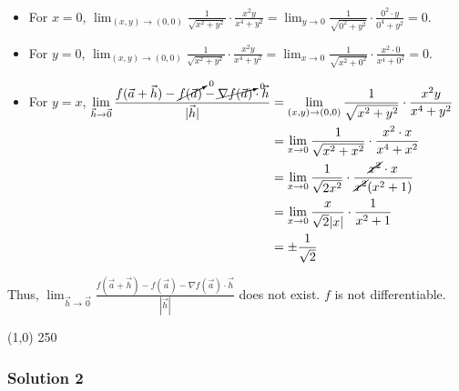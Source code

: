 \begin{itemize}
    \item For $x = 0$, $\lim_{(x,y)\to(0,0)} \frac{1}{\sqrt{x^2+y^2}} \cdot \frac{x^2y}{x^4 + y^2} = \lim_{y\to0} \frac{1}{\sqrt{0^2+y^2}} \cdot \frac{0^2 \cdot y}{0^4 + y^2} = 0$. 
    \item For $y = 0$, $\lim_{(x,y)\to(0,0)} \frac{1}{\sqrt{x^2+y^2}} \cdot \frac{x^2y}{x^4 + y^2} = \lim_{x\to0} \frac{1}{\sqrt{x^2+0^2}} \cdot \frac{x^2 \cdot 0}{x^4 + 0^2} = 0$. 
    \item For $y = x$, $\begin{aligned}[t]
        \lim_{\vec{h}\to\vec{0}} \frac{f(\vec{a} + \vec{h}) - \cancelto{0}{f(\vec{a})} - \cancelto{0}{\nabla f(\vec{a})} \cdot \vec{h}}{| \vec{h} |}
         & = \lim_{(x,y)\to(0,0)} \frac{1}{\sqrt{x^2+y^2}} \cdot \frac{x^2y}{x^4 + y^2}                   \\
         & = \lim_{x\to0} \frac{1}{\sqrt{x^2 + x^2}} \cdot \frac{x^2 \cdot x}{x^4 + x^2}                  \\
         & = \lim_{x\to0} \frac{1}{\sqrt{2x^2}} \cdot \frac{\cancel{x^2} \cdot x}{\cancel{x^2} (x^2 + 1)} \\
         & = \lim_{x\to0} \frac{x}{\sqrt{2}|x|} \cdot \frac{1}{x^2 + 1}                                   \\
         & = \pm \frac{1}{\sqrt{2}}
    \end{aligned}$
\end{itemize}

Thus, $\lim_{\vec{h}\to\vec{0}} \frac{f(\vec{a} + \vec{h}) - f(\vec{a}) - \nabla f(\vec{a}) \cdot \vec{h}}{| \vec{h} |}$ does not exist. $f$ is not differentiable. 

\begin{center} \line(1,0) {250} \end{center}

\subsubsection*{Solution 2}

